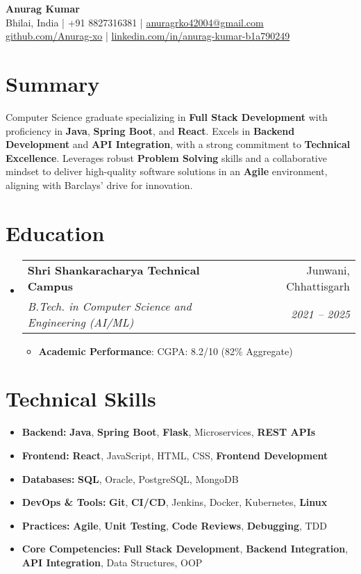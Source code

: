 \documentclass[letterpaper,10pt]{article}
\makeatletter
\newcommand{\resumeItem}[2]{\item \small{\textbf{#1}: #2}}
\newcommand{\resumeSubheading}[4]{
  \item
    \begin{tabular*}{0.97\textwidth}{l@{\extracolsep{\fill}}r}
      \textbf{#1} & #2 \\
      \textit{\small #3} & \textit{\small #4} \\
    \end{tabular*}\vspace{-3pt}
}
\newcommand{\resumeSubHeadingListStart}{\begin{itemize}[leftmargin=*]}
\newcommand{\resumeSubHeadingListEnd}{\end{itemize}}
\newcommand{\resumeItemListStart}{\begin{itemize}[leftmargin=*]}
\newcommand{\resumeItemListEnd}{\end{itemize}\vspace{-4pt}}
\makeatother
\begin{document}
\begin{center}
  {\Large \textbf{Anurag Kumar}}\\[3pt]
  Bhilai, India | +91 8827316381 | \href{mailto:anuragrko42004@gmail.com}{anuragrko42004@gmail.com}\\
  \href{https://github.com/Anurag-xo}{github.com/Anurag-xo} | \href{https://www.linkedin.com/in/anurag-kumar-b1a790249}{linkedin.com/in/anurag-kumar-b1a790249}
\end{center}

\section{Summary}
Computer Science graduate specializing in \textbf{Full Stack Development} with proficiency in \textbf{Java}, \textbf{Spring Boot}, and \textbf{React}. Excels in \textbf{Backend Development} and \textbf{API Integration}, with a strong commitment to \textbf{Technical Excellence}. Leverages robust \textbf{Problem Solving} skills and a collaborative mindset to deliver high-quality software solutions in an \textbf{Agile} environment, aligning with Barclays' drive for innovation.

\section{Education}
\resumeSubHeadingListStart
  \resumeSubheading
    {Shri Shankaracharya Technical Campus}{Junwani, Chhattisgarh}
    {B.Tech. in Computer Science and Engineering (AI/ML)}{2021 – 2025}
  \resumeItemListStart
    \resumeItem{Academic Performance}{CGPA: 8.2/10 (82\% Aggregate)}
  \resumeItemListEnd
\resumeSubHeadingListEnd

\section{Technical Skills}
\resumeSubHeadingListStart
  \item[] \textbf{Backend:} \textbf{Java}, \textbf{Spring Boot}, \textbf{Flask}, Microservices, \textbf{REST APIs}
  \item[] \textbf{Frontend:} \textbf{React}, JavaScript, HTML, CSS, \textbf{Frontend Development}
  \item[] \textbf{Databases:} \textbf{SQL}, Oracle, PostgreSQL, MongoDB
  \item[] \textbf{DevOps & Tools:} \textbf{Git}, \textbf{CI/CD}, Jenkins, Docker, Kubernetes, \textbf{Linux}
  \item[] \textbf{Practices:} \textbf{Agile}, \textbf{Unit Testing}, \textbf{Code Reviews}, \textbf{Debugging}, TDD
  \item[] \textbf{Core Competencies:} \textbf{Full Stack Development}, \textbf{Backend Integration}, \textbf{API Integration}, Data Structures, OOP
\resumeSubHeadingListEnd
\end{document}
